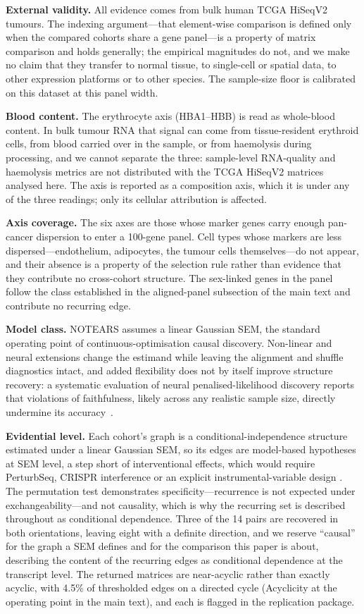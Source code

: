 \documentclass[11pt]{article}
\begin{document}
\textbf{External validity.} All evidence comes from bulk human TCGA HiSeqV2 tumours. The indexing argument---that element-wise comparison is defined only when the compared cohorts share a gene panel---is a property of matrix comparison and holds generally; the empirical magnitudes do not, and we make no claim that they transfer to normal tissue, to single-cell or spatial data, to other expression platforms or to other species. The sample-size floor is calibrated on this dataset at this panel width.

\textbf{Blood content.} The erythrocyte axis (HBA1--HBB) is read as whole-blood content. In bulk tumour RNA that signal can come from tissue-resident erythroid cells, from blood carried over in the sample, or from haemolysis during processing, and we cannot separate the three: sample-level RNA-quality and haemolysis metrics are not distributed with the TCGA HiSeqV2 matrices analysed here. The axis is reported as a composition axis, which it is under any of the three readings; only its cellular attribution is affected.

\textbf{Axis coverage.} The six axes are those whose marker genes carry enough pan-cancer dispersion to enter a 100-gene panel. Cell types whose markers are less dispersed---endothelium, adipocytes, the tumour cells themselves---do not appear, and their absence is a property of the selection rule rather than evidence that they contribute no cross-cohort structure. The sex-linked genes in the panel follow the class established in the aligned-panel subsection of the main text and contribute no recurring edge.

\textbf{Model class.} NOTEARS assumes a linear Gaussian SEM, the standard operating point of continuous-optimisation causal discovery. Non-linear and neural extensions change the estimand while leaving the alignment and shuffle diagnostics intact, and added flexibility does not by itself improve structure recovery: a systematic evaluation of neural penalised-likelihood discovery reports that violations of faithfulness, likely across any realistic sample size, directly undermine its accuracy~\citep{olko2025faithfulness}.

\textbf{Evidential level.} Each cohort's graph is a conditional-independence structure estimated under a linear Gaussian SEM, so its edges are model-based hypotheses at SEM level, a step short of interventional effects, which would require PerturbSeq, CRISPR interference or an explicit instrumental-variable design \citep{pearl2009causality,sachs2005causal}. The permutation test demonstrates specificity---recurrence is not expected under exchangeability---and not causality, which is why the recurring set is described throughout as conditional dependence. Three of the 14 pairs are recovered in both orientations, leaving eight with a definite direction, and we reserve ``causal'' for the graph a SEM defines and for the comparison this paper is about, describing the content of the recurring edges as conditional dependence at the transcript level. The returned matrices are near-acyclic rather than exactly acyclic, with 4.5\% of thresholded edges on a directed cycle (Acyclicity at the operating point in the main text), and each is flagged in the replication package.
\end{document}
